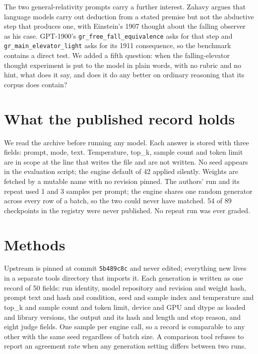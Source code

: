 \documentclass[reprint,prx,amsmath,amssymb,aps,superscriptaddress]{revtex4-2}
\begin{document}
The two general-relativity prompts carry a further interest. Zahavy \cite{ref2} argues that language models carry out deduction from a stated premise but not the abductive step that produces one, with Einstein's 1907 thought about the falling observer as his case. GPT-1900's \texttt{gr\_free\_fall\_equivalence} asks for that step and \texttt{gr\_main\_elevator\_light} asks for its 1911 consequence, so the benchmark contains a direct test. We added a fifth question: when the falling-elevator thought experiment is put to the model in plain words, with no rubric and no hint, what does it say, and does it do any better on ordinary reasoning that its corpus does contain?

\section{What the published record holds}

We read the archive before running any model. Each answer is stored with three fields: prompt, mode, text. Temperature, top\_k, sample count and token limit are in scope at the line that writes the file and are not written. No seed appears in the evaluation script; the engine default of 42 applied silently. Weights are fetched by a mutable name with no revision pinned. The authors' run and its repeat used 1 and 3 samples per prompt; the engine shares one random generator across every row of a batch, so the two could never have matched. 54 of 89 checkpoints in the registry were never published. No repeat run was ever graded.

\section{Methods}

Upstream is pinned at commit \texttt{5b489c8c} and never edited; everything new lives in a separate tools directory that imports it. Each generation is written as one record of 50 fields: run identity, model repository and revision and weight hash, prompt text and hash and condition, seed and sample index and temperature and top\_k and sample count and token limit, device and GPU and dtype as loaded and library versions, the output and its hash and length and stop reason, and eight judge fields. One sample per engine call, so a record is comparable to any other with the same seed regardless of batch size. A comparison tool refuses to report an agreement rate when any generation setting differs between two runs.
\end{document}
